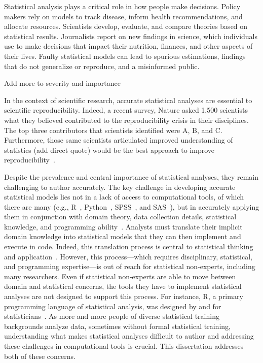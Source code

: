 
Statistical analysis plays a critical role in how people make decisions. Policy
makers rely on models to track disease, inform health recommendations, and
allocate resources. Scientists develop, evaluate, and compare theories based on
statistical results. Journalists report on new findings in science, which
individuals use to make decisions that impact their nutrition, finances, and
other aspects of their lives. Faulty statistical models can lead to spurious
estimations, findings that do not generalize or reproduce, and a misinformed
public. 

Add more to severity and importance 

In the context of scientific research, accurate statistical analyses are
essential to scientific reproducibility. Indeed, a recent survey, Nature asked
1,500 scientists what they believed contributed to the reproducibility crisis in
their disciplines. The top three contributors that scientists identified were A,
B, and C. Furthermore, those same scientists articulated improved understanding
of statistics (add direct quote) would be the best approach to improve
reproducibility~\cite{}. 

Despite the prevalence and central importance of statistical analyses, they
remain challenging to author accurately. The key challenge in developing
accurate statistical models lies not in a lack of access to computational tools,
of which there are many (e.g., R~\cite{team2013r},
Python~\cite{sanner1999python}, SPSS~\cite{spss}, and SAS~\cite{sas}), but in
accurately applying them in conjunction with domain theory, data collection
details, statistical knowledge, and programming
ability~\cite{mcelreath2020statistical}. Analysts must translate their implicit
domain knowledge into statistical models that they can then implement and
execute in code. Indeed, this translation process is central to statistical
thinking and application~\cite{}. However, this process---which requires
disciplinary, statistical, and programming expertise---is out of reach for
statistical non-experts, including many researchers. Even if statistical
non-experts are able to move between domain and statistical concerns, the tools
they have to implement statistical analyses are not designed to support this
process. For instance, R, a primary programming language of statistical
analysis, was designed by and for statisticians~\cite{}. As more and more people
of diverse statistical training backgrounds analyze data, sometimes without
formal statistical training, understanding what makes statistical analyses
difficult to author and addressing these challenges in computational tools is
crucial. This dissertation addresses both of these concerns. 


